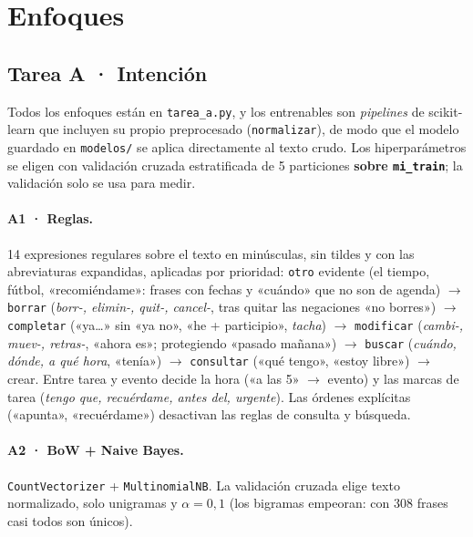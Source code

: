 \documentclass[10pt,a4paper]{article}
\newcommand{\cod}[1]{\texttt{#1}}
\begin{document}
\section{Enfoques}\label{sec:enfoques}

\subsection{Tarea A · Intención}
Todos los enfoques están en \cod{tarea\_a.py}, y los entrenables son \textit{pipelines} de scikit-learn que incluyen su propio preprocesado (\cod{normalizar}), de modo que el modelo guardado en \cod{modelos/} se aplica directamente al texto crudo. Los hiperparámetros se eligen con validación cruzada estratificada de 5 particiones \textbf{sobre \cod{mi\_train}}; la validación solo se usa para medir.

\paragraph{A1 · Reglas.} 14 expresiones regulares sobre el texto en minúsculas, sin tildes y con las abreviaturas expandidas, aplicadas por prioridad: \cod{otro} evidente (el tiempo, fútbol, «recomiéndame»: frases con fechas y «cuándo» que no son de agenda) $\rightarrow$ \cod{borrar} (\textit{borr-, elimin-, quit-, cancel-}, tras quitar las negaciones «no borres») $\rightarrow$ \cod{completar} («ya\dots» sin «ya no», «he + participio», \textit{tacha}) $\rightarrow$ \cod{modificar} (\textit{cambi-, muev-, retras-}, «ahora es»; protegiendo «pasado mañana») $\rightarrow$ \cod{buscar} (\textit{cuándo, dónde, a qué hora}, «tenía») $\rightarrow$ \cod{consultar} («qué tengo», «estoy libre») $\rightarrow$ crear. Entre tarea y evento decide la hora («a las 5» $\rightarrow$ evento) y las marcas de tarea (\textit{tengo que, recuérdame, antes del, urgente}). Las órdenes explícitas («apunta», «recuérdame») desactivan las reglas de consulta y búsqueda.

\paragraph{A2 · BoW + Naive Bayes.} \cod{CountVectorizer} + \cod{MultinomialNB}. La validación cruzada elige texto normalizado, solo unigramas y $\alpha=0{,}1$ (los bigramas empeoran: con 308 frases casi todos son únicos).
\end{document}
